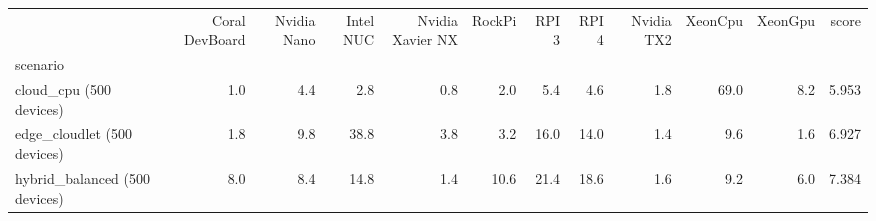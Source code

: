 \begin{tabular}{lrrrrrrrrrrr}
\toprule
{} &  Coral DevBoard &  Nvidia Nano &  Intel NUC &  Nvidia Xavier NX &  RockPi &  RPI 3 &  RPI 4 &  Nvidia TX2 &  XeonCpu &  XeonGpu &  score \\
scenario                      &                 &              &            &                   &         &        &        &             &          &          &        \\
\midrule
cloud\_cpu (500 devices)       &             1.0 &          4.4 &        2.8 &               0.8 &     2.0 &    5.4 &    4.6 &         1.8 &     69.0 &      8.2 &  5.953 \\
edge\_cloudlet (500 devices)   &             1.8 &          9.8 &       38.8 &               3.8 &     3.2 &   16.0 &   14.0 &         1.4 &      9.6 &      1.6 &  6.927 \\
hybrid\_balanced (500 devices) &             8.0 &          8.4 &       14.8 &               1.4 &    10.6 &   21.4 &   18.6 &         1.6 &      9.2 &      6.0 &  7.384 \\
\bottomrule
\end{tabular}
